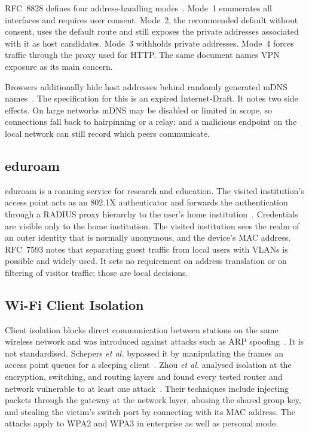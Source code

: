 \documentclass[conference]{IEEEtran}
\begin{document}
RFC~8828 defines four address-handling modes~\cite{rfc8828}. Mode~1 enumerates all interfaces and requires user consent. Mode~2, the recommended default without consent, uses the default route and still exposes the private addresses associated with it as host candidates. Mode~3 withholds private addresses. Mode~4 forces traffic through the proxy used for HTTP. The same document names VPN exposure as its main concern.

Browsers additionally hide host addresses behind randomly generated mDNS names~\cite{mdnsdraft}. The specification for this is an expired Internet-Draft. It notes two side effects. On large networks mDNS may be disabled or limited in scope, so connections fall back to hairpinning or a relay; and a malicious endpoint on the local network can still record which peers communicate.

\subsection{eduroam}
eduroam is a roaming service for research and education. The visited institution's access point acts as an 802.1X authenticator and forwards the authentication through a RADIUS proxy hierarchy to the user's home institution~\cite{rfc7593}. Credentials are visible only to the home institution. The visited institution sees the realm of an outer identity that is normally anonymous, and the device's MAC address. RFC~7593 notes that separating guest traffic from local users with VLANs is possible and widely used. It sets no requirement on address translation or on filtering of visitor traffic; those are local decisions.

\subsection{Wi-Fi Client Isolation}
Client isolation blocks direct communication between stations on the same wireless network and was introduced against attacks such as ARP spoofing~\cite{mirzoev2014}. It is not standardised. Schepers \emph{et al.} bypassed it by manipulating the frames an access point queues for a sleeping client~\cite{framingframes2023,macstealer}. Zhou \emph{et al.} analysed isolation at the encryption, switching, and routing layers and found every tested router and network vulnerable to at least one attack~\cite{airsnitch2026}. Their techniques include injecting packets through the gateway at the network layer, abusing the shared group key, and stealing the victim's switch port by connecting with its MAC address. The attacks apply to WPA2 and WPA3 in enterprise as well as personal mode.
\end{document}
